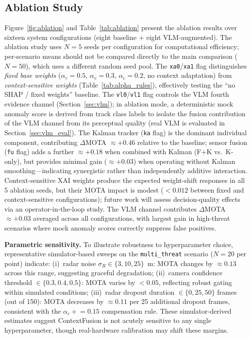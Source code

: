 \documentclass[drones,article,submit,pdftex]{Definitions/mdpi}
\begin{document}
\subsection{Ablation Study}

Figure~\ref{fig:ablation} and Table~\ref{tab:ablation} present the ablation
results over sixteen system configurations (eight baseline + eight VLM-augmented).
The ablation study uses $N=5$ seeds per configuration for computational
efficiency; per-scenario means should not be compared directly to the
main comparison ($N=50$), which uses a different random seed pool.
The \texttt{xa0}/\texttt{xa1} flag distinguishes \emph{fixed base weights}
($\alpha_r=0.5,\,\alpha_v=0.3,\,\alpha_c=0.2$, no context adaptation)
from \emph{context-sensitive weights} (Table~\ref{tab:alpha_rules}),
effectively testing the ``no SHAP / fixed weights'' baseline.
The \texttt{vl0}/\texttt{vl1} flag controls the VLM fourth evidence channel
(Section~\ref{sec:vlm}); in ablation mode, a deterministic mock anomaly score
is derived from track class labels to isolate the fusion contribution of the
VLM channel from its perceptual quality
(real VLM is evaluated in Section~\ref{sec:vlm_eval}).
The Kalman tracker (\texttt{ka} flag) is the dominant individual component,
contributing $\Delta$MOTA $\approx +0.46$ relative to the baseline;
sensor fusion (\texttt{fu} flag) adds a further $\approx +0.18$ when
combined with Kalman (F+K vs.\ K-only), but provides minimal gain
($\approx +0.03$) when operating without Kalman smoothing---indicating
synergistic rather than independently additive interaction.
Context-sensitive XAI weights produce the expected weight-shift responses
in all 5 ablation seeds, but their MOTA impact is modest ($<\!0.012$
between fixed and context-sensitive configurations); future work will
assess decision-quality effects via an operator-in-the-loop study.
The VLM channel contributes $\Delta$MOTA $\approx +0.03$ averaged across
all configurations, with largest gain in high-threat scenarios where mock
anomaly scores correctly suppress false positives.

\textbf{Parametric sensitivity.}
To illustrate robustness to hyperparameter choice, representative
simulator-based sweeps on the \texttt{multi\_threat} scenario ($N=20$ per
point) indicate:
(i)~radar noise $\sigma_R \in \{3, 10, 25\}$~m: MOTA changes by $\approx
0.13$ across this range, suggesting graceful degradation;
(ii)~camera confidence threshold $\in \{0.3, 0.4, 0.5\}$: MOTA varies by
$<\!0.05$, reflecting robust gating within simulated conditions;
(iii)~radar dropout duration $\in \{0, 25, 50\}$ frames (out of 150): MOTA
decreases by $\approx 0.11$ per 25 additional dropout frames, consistent
with the $\alpha_c\mathrel{+}=0.15$ compensation rule.
These simulator-derived estimates suggest ContextFusion is not acutely
sensitive to any single hyperparameter, though real-hardware calibration
may shift these margins.
\end{document}

